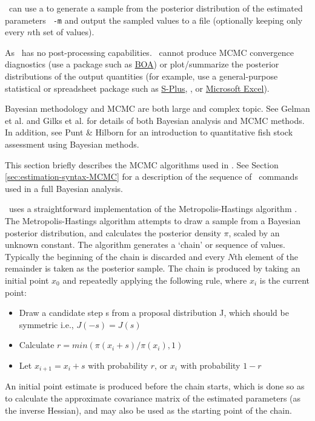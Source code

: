 \CNAME\ can use a  to generate a sample from the posterior distribution of the estimated parameters \texttt{\cname\ -m} and output the sampled values to a file (optionally keeping only every $n$th set of values).

As \CNAME\ has no post-processing capabilities. \CNAME\ cannot produce MCMC convergence diagnostics (use a package such as \href{http://www.public-health.uiowa.edu/boa}{BOA}) or plot/summarize the posterior distributions of the output quantities (for example, use a general-purpose statistical or spreadsheet package such as \href{http://www.insightful.com}{S-Plus}, \href{http://www.r-project.org}{\R}, or \href{http://www.microsoft.com}{Microsoft Excel}).

Bayesian methodology and MCMC are both large and complex topic. See Gelman et al. \citeyearpar{823} and Gilks et al. \citeyearpar{143} for details of both Bayesian analysis and MCMC methods. In addition, see Punt \& Hilborn \citeyearpar{828} for an introduction to quantitative fish stock assessment using Bayesian methods. 

This section briefly describes the MCMC algorithms used in \CNAME. See Section \ref{sec:estimation-syntax-MCMC} for a description of the sequence of \CNAME\ commands used in a full Bayesian analysis.

\CNAME\ uses a straightforward implementation of the Metropolis-Hastings algorithm \citep{823,143}. The Metropolis-Hastings algorithm attempts to draw a sample from a Bayesian posterior distribution, and calculates the posterior density $\pi$, scaled by an unknown constant. The algorithm generates a `chain' or sequence of values. Typically the beginning of the chain is discarded and every $N$th element of the remainder is taken as the posterior sample. The chain is produced by taking an initial point $x_0$ and repeatedly applying the following rule, where $x_i$ is the current point: 

\begin{itemize}
\item Draw a candidate step s from a proposal distribution J, which should be symmetric i.e., $J(-s)=J(s)$
\item Calculate $r=min(\pi(x_i+s)/\pi(x_i),1)$
\item Let $x_{i+1}=x_i+s$ with probability $r$, or $x_i$ with probability $1-r$
\end{itemize}

An initial point estimate is produced before the chain starts, which is done so as to calculate the approximate covariance matrix of the estimated parameters (as the inverse Hessian), and may also be used as the starting point of the chain. 

